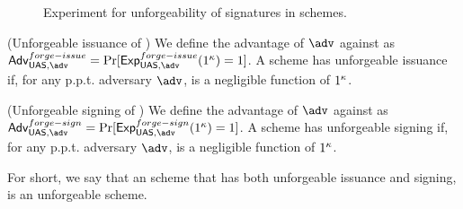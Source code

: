 \begin{figure}[htp!]
  \caption{Experiment for unforgeability of signatures in \UAS schemes.}
  \label{fig:exp-uas-unfor-sign}
\end{figure}

\begin{definition}{(Unforgeable issuance of \UAS)}
  \label{def:issue-forge-uas}  
  We define the advantage \AdvForgeIssue of $\adv$ against \ExpForgeIssue as
  $\AdvForgeIssue=\Pr\lbrack\ExpForgeIssue(1^\secpar)=1\rbrack$.
  A \UAS scheme has unforgeable issuance if, for any p.p.t. adversary $\adv$,
  \AdvForgeIssue is a negligible function of $1^\kappa$.
\end{definition}

\begin{definition}{(Unforgeable signing of \UAS)}
  \label{def:sign-forge-uas}  
  We define the advantage \AdvForgeSign of $\adv$ against \ExpForgeSign as
  $\AdvForgeSign=\Pr\lbrack\ExpForgeSign(1^\secpar)=1\rbrack$.
  A \UAS scheme has unforgeable signing if, for any p.p.t. adversary $\adv$,
  \AdvForgeSign is a negligible function of $1^\kappa$.
\end{definition}

For short, we say that an \UAS scheme that has both unforgeable issuance and
signing, is an unforgeable \UAS scheme.

